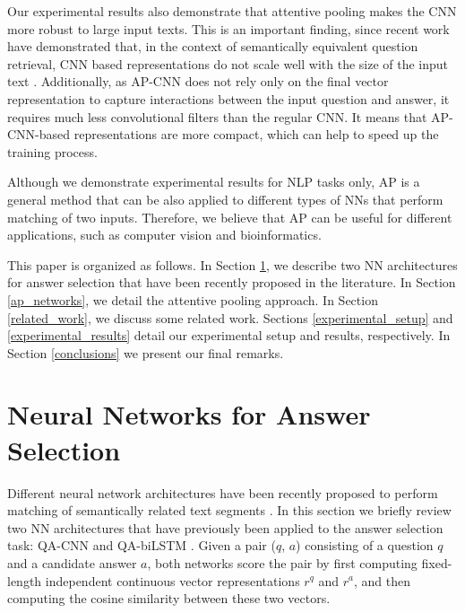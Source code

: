 \documentclass{article}
\begin{document}
Our experimental results also demonstrate that attentive pooling makes the CNN more robust to large input texts.
This is an important finding,
since recent work have demonstrated that,
in the context of semantically equivalent question retrieval,
CNN based representations do not scale well with the size of the input text \cite{dos2015learning}.
Additionally,
as AP-CNN does not rely only on the final vector representation to capture interactions between the input question and answer,
it requires much less convolutional filters than the regular CNN. It means that AP-CNN-based representations are more compact,
which can help to speed up the training process.

Although we demonstrate experimental results for NLP tasks only, 
AP is a general method that can be also applied to different types of NNs that perform matching of two inputs.
Therefore,
we believe that AP can be useful for different applications, such as computer vision and bioinformatics.

This paper is organized as follows. 
In Section \ref{neural_nets}, 
we describe two NN architectures for answer selection that have been recently proposed in the literature. 
In Section \ref{ap_networks}, 
we detail the attentive pooling approach.
In Section \ref{related_work}, 
we discuss some related work. 
Sections \ref{experimental_setup} and \ref{experimental_results} detail our experimental setup and results, respectively. 
In Section \ref{conclusions} we present our final remarks.
 \section{Neural Networks for Answer Selection}
\label{neural_nets}
Different neural network architectures have  been recently proposed to perform matching of semantically related text segments \cite{yu2014,hu2014,dos2015learning,wang2015,severyn2015,tan:Arxiv15}.
In this section we briefly review two NN architectures that have previously been applied to the answer selection task:
QA-CNN \cite{feng2015applying} and QA-biLSTM \cite{tan:Arxiv15}.
Given a pair ($q$, $a$) consisting of a question $q$ and a candidate answer $a$,
both networks score the pair by first computing fixed-length independent continuous vector representations $r^q$ and $r^a$,
and then computing the cosine similarity between these two vectors.
\end{document}
